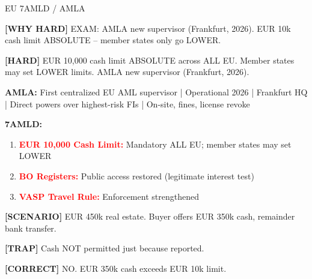 \documentclass[6pt,aspectratio=169,fontsize=5pt]{beamer}
\renewcommand{\tiny}{\fontsize{3.5pt}{4.5pt}\selectfont}
\renewcommand{\normalsize}{\fontsize{7.5pt}{8.5pt}\selectfont}
\newcommand{\trap}[1]{%
	\begin{block}{\textcolor{redtrap}{\textbf{[TRAP]}}}
		\textcolor{redtrap}{\tiny #1}
	\end{block}
}
\newcommand{\scenario}[1]{%
	\begin{block}{\textbf{[SCENARIO]}}
		\tiny #1
	\end{block}
}
\newcommand{\correct}[1]{%
	\begin{block}{\textcolor{greencorrect}{\textbf{[CORRECT]}}}
		\textcolor{greencorrect}{\tiny #1}
	\end{block}
}
\newcommand{\hard}[1]{%
	\begin{block}{\textcolor{hardcolor}{\textbf{[HARD]}}}
		\textcolor{hardcolor}{\tiny #1}
	\end{block}
}
\newcommand{\hardexplain}[1]{%
	\begin{block}{\textcolor{orangehard}{\textbf{[WHY HARD]}}}
		\textcolor{orangehard}{\tiny #1}
	\end{block}
}
\begin{document}
	\begin{frame}{\normalsize EU 7AMLD / AMLA}
		
		\hardexplain{EXAM: AMLA new supervisor (Frankfurt, 2026). EUR 10k cash limit ABSOLUTE -- member states only go LOWER.}
		
		\hard{EUR 10,000 cash limit ABSOLUTE across ALL EU. Member states may set LOWER limits. AMLA new supervisor (Frankfurt, 2026).}
		
		\textbf{AMLA:} First centralized EU AML supervisor | Operational 2026 | Frankfurt HQ | Direct powers over highest-risk FIs | On-site, fines, license revoke
		
		\textbf{7AMLD:}
		\begin{enumerate}
			\item \textcolor{red}{\textbf{EUR 10,000 Cash Limit:}} Mandatory ALL EU; member states may set LOWER
			\item \textcolor{red}{\textbf{BO Registers:}} Public access restored (legitimate interest test)
			\item \textcolor{red}{\textbf{VASP Travel Rule:}} Enforcement strengthened
		\end{enumerate}
		
		\scenario{EUR 450k real estate. Buyer offers EUR 350k cash, remainder bank transfer.}
		
		\trap{Cash NOT permitted just because reported.}
		
		\correct{NO. EUR 350k cash exceeds EUR 10k limit.}
	\end{frame}
	
\end{document}
